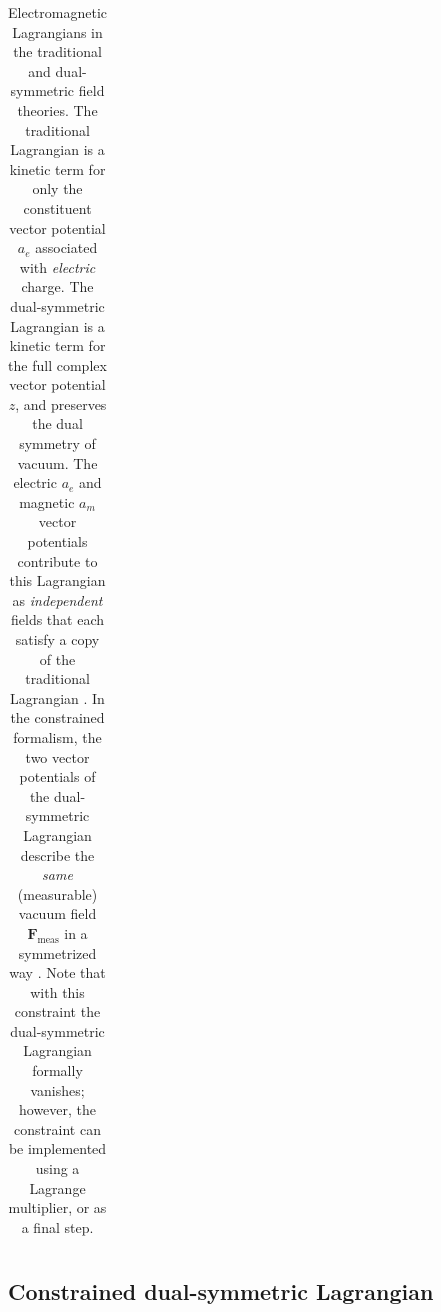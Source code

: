 \documentclass[1p,sort&compress]{elsarticle}
\numberwithin{equation}{section}
\newcommand{\bv}[1]{\mathbf{#1}}
\begin{document}
\begin{table}
\begin{tabular}{l l}
    \\
    \hline 
 \end{tabular}
 \caption[Electromagnetic Lagrangians]{Electromagnetic Lagrangians in the traditional and dual-symmetric field theories.  The traditional Lagrangian is a kinetic term for only the constituent vector potential $a_e$ associated with \emph{electric} charge.  The dual-symmetric Lagrangian is a kinetic term for the full complex vector potential $z$, and preserves the dual symmetry of vacuum.  The electric $a_e$ and magnetic $a_m$ vector potentials contribute to this Lagrangian as \emph{independent} fields that each satisfy a copy of the traditional Lagrangian \cite{Singleton1995,Singleton1996,Kato2002,Vasconcellos2014}. In the constrained formalism, the two vector potentials of the dual-symmetric Lagrangian describe the \emph{same} (measurable) vacuum field $\bv{F}_{\text{meas}}$ in a symmetrized way \cite{Bliokh2013,Cameron2012}. Note that with this constraint the dual-symmetric Lagrangian formally vanishes; however, the constraint can be implemented using a Lagrange multiplier, or as a final step.}
 \label{tab:lagrangians}
\end{table}


\subsection{Constrained dual-symmetric Lagrangian}\label{sec:constituentconstraint}

\end{document}
